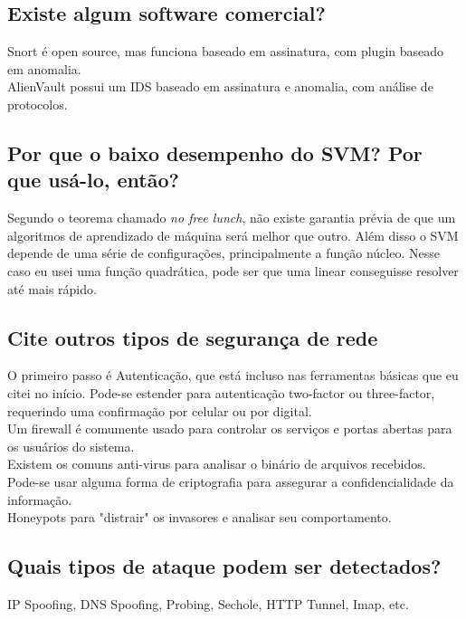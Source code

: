 \documentclass[12pt,a4paper]{article}
\begin{document}
    \subsection{Existe algum software comercial?}
    Snort é open source, mas funciona baseado em assinatura, com plugin baseado em anomalia.\\
    AlienVault possui um IDS baseado em assinatura e anomalia, com análise de protocolos.

    \subsection{Por que o baixo desempenho do SVM? Por que usá-lo, então?}
    Segundo o teorema chamado \emph{no free lunch}, não existe garantia prévia de que um algoritmos de aprendizado de
    máquina será melhor que outro. Além disso o SVM depende de uma série de configurações, principalmente a função
    núcleo. Nesse caso eu usei uma função quadrática, pode ser que uma linear conseguisse resolver até mais rápido.

    \subsection{Cite outros tipos de segurança de rede}
    O primeiro passo é Autenticação, que está incluso nas ferramentas básicas que eu citei no início. Pode-se estender
    para autenticação two-factor ou three-factor, requerindo uma confirmação por celular ou por digital.\\
    Um firewall é comumente usado para controlar os serviços e portas abertas para os usuários do sistema. \\
    Existem os comuns anti-virus para analisar o binário de arquivos recebidos. \\
    Pode-se usar alguma forma de criptografia para assegurar a confidencialidade da informação. \\
    Honeypots para "distrair" os invasores e analisar seu comportamento.

    \subsection{Quais tipos de ataque podem ser detectados?}
    IP Spoofing, DNS Spoofing, Probing, Sechole, HTTP Tunnel, Imap, etc.
\end{document}
